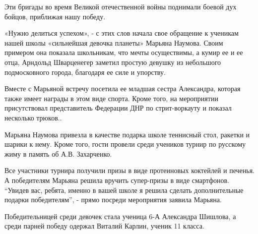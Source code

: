 Эти бригады во время Великой отечественной войны поднимали боевой дух бойцов,
приближая нашу победу.



«Нужно делиться успехом», - с этих слов начала свое обращение к ученикам нашей
школы «сильнейшая девочка планеты» Марьяна Наумова. Своим примером она показала
школьникам, что мечты осуществимы, а кумир ее и ее отца, Арндольд Шварценегер
заметил простую девушку из небольшого подмосковного города, благодаря ее силе и
упорству.

Вместе с Марьяной встречу посетила ее младшая сестра Александра, которая также
имеет награды в этом виде спорта. Кроме того, на мероприятии присутствовал
представитель Федерации ДНР по стрит-воркауту и показал несколько трюков..

Марьяна Наумова привезла в качестве подарка школе теннисный стол, ракетки и
шарики к нему. Кроме того, гости провели среди учеников турнир по русскому жиму
в память об А.В. Захарченко.

Все участники турнира получили призы в виде протеиновых коктейлей и печенья. А
победителям Марьяна решила вручить супер-призы в виде смартфонов. \enquote{Увидев вас,
ребята, именно в вашей школе я решила сделать дополнительные подарки
победителям}, - прямо посреди мероприятия заявила Марьяна.

Победительницей среди девочек стала ученица 6-А Александра Шишлова, а среди
парней победу одержал Виталий Карлин, ученик 11 класса.

